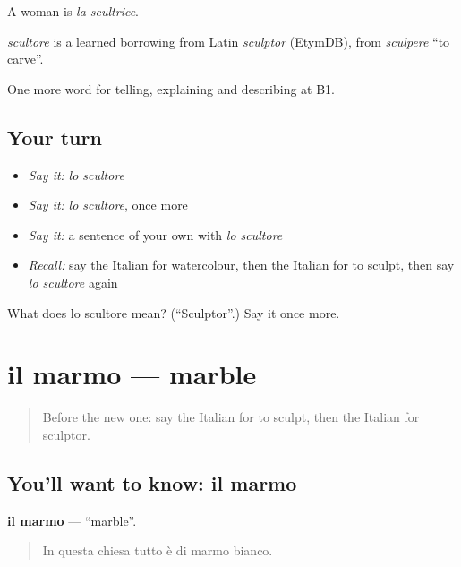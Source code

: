 A woman is \emph{la scultrice}.

\begin{cousinweb}
\emph{scultore} is a learned borrowing from Latin \emph{sculptor} (EtymDB), from \emph{sculpere} \textquotedblleft{}to carve\textquotedblright{}.
\end{cousinweb}

\begin{grammarlens}[title={What you've built}]
One more word for telling, explaining and describing at B1.
\end{grammarlens}

\subsection*{Your turn}
\begin{itemize}
\raggedright
  \item \emph{Say it:} \emph{lo scultore}
  \item \emph{Say it:} \emph{lo scultore}, once more
  \item \emph{Say it:} a sentence of your own with \emph{lo scultore}
  \item \emph{Recall:} say the Italian for watercolour, then the Italian for to sculpt, then say \emph{lo scultore} again
\end{itemize}

\begin{tcolorbox}[breakable,colback=teal!4,colframe=teal!35!black,title={Before you move on}]
What does lo scultore mean? (\textquotedblleft{}Sculptor\textquotedblright{}.) Say it once more.
\end{tcolorbox}
\section[il marmo]{il marmo — marble}

\label{lesson:IT-C522-marmo}



\begin{quote}
Before the new one: say the Italian for to sculpt, then the Italian for sculptor.
\end{quote}

\subsection*{You'll want to know: il marmo}
\textbf{il marmo} — \textquotedblleft{}marble\textquotedblright{}.

\begin{quote}
In questa chiesa tutto è di marmo bianco.
\end{quote}

